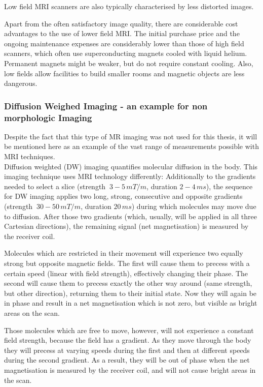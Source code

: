 Low field MRI scanners are also typically characterised by less distorted images. \cite{Fransson2001}

Apart from the often satisfactory image quality, there are considerable cost advantages to the use of lower field MRI.
The initial purchase price and the ongoing maintenance expenses are considerably lower than those of high field scanners, which often use superconducting magnets cooled with liquid helium. \cite{Rutt1996}
Permanent magnets might be weaker, but do not require constant cooling.
Also, low fields allow facilities to build smaller rooms and magnetic objects are less dangerous.


\subsubsection{Diffusion Weighed Imaging - an example for non morphologic Imaging}

Despite the fact that this type of MR imaging was not used for this thesis, it will be mentioned here as an example of the vast range of measurements possible with MRI techniques.\\

Diffusion weighted (DW) imaging quantifies molecular diffusion in the body.
This imaging technique uses MRI technology differently:
Additionally to the gradients needed to select a slice (strength $~3-5\, mT/m$, duration $2-4\, ms$), the sequence for DW imaging applies two long, strong, consecutive and opposite gradients (strength $~30-50\, mT/m$, duration $20\, ms$) during which molecules may move due to diffusion.
After those two gradients (which, usually, will be applied in all three Cartesian directions), the remaining signal (net magnetisation) is measured by the receiver coil.

Molecules which are restricted in their movement will experience two equally strong but opposite magnetic fields.
The first will cause them to precess with a certain speed (linear with field strength), effectively changing their phase.
The second will cause them to precess exactly the other way around (same strength, but other direction), returning them to their initial state.
Now they will again be in phase and result in a net magnetisation which is not zero, but visible as bright areas on the scan.

Those molecules which are free to move, however, will not experience a constant field strength, because the field has a gradient.
As they move through the body they will precess at varying speeds during the first and then at different speeds during the second gradient.
As a result, they will be out of phase when the net magnetisation is measured by the receiver coil, and will not cause bright areas in the scan.

